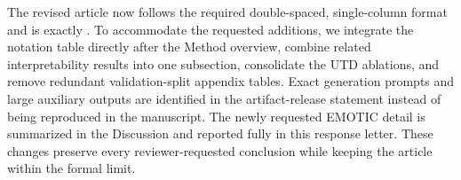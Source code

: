 {The revised article now follows the required double-spaced, single-column format and is exactly . To accommodate the requested additions, we integrate the notation table directly after the Method overview, combine related interpretability results into one subsection, consolidate the UTD ablations, and remove redundant validation-split appendix tables. Exact generation prompts and large auxiliary outputs are identified in the artifact-release statement instead of being reproduced in the manuscript. The newly requested EMOTIC detail is summarized in the Discussion and reported fully in this response letter. These changes preserve every reviewer-requested conclusion while keeping the article within the formal limit.
}
\showNotation
